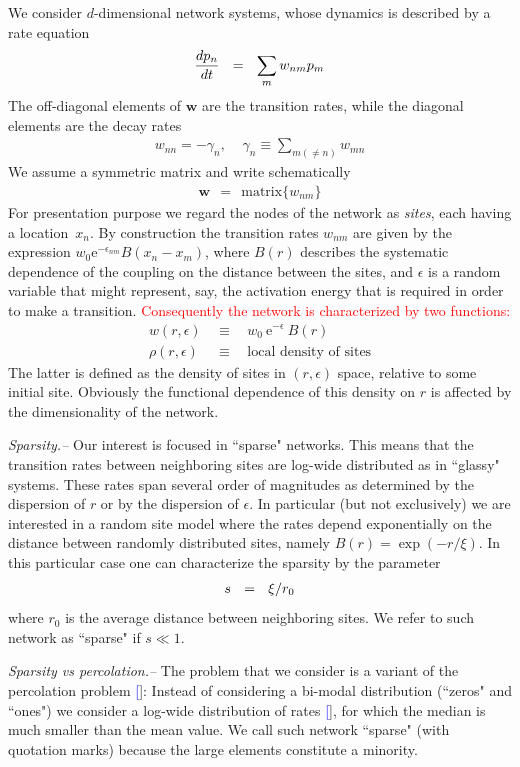 \documentclass[aps,prb,floats,floatfix,twocolumn]{revtex4}
\newcommand{\eexp}{\mbox{e}^}
\newcommand{\mylabel}[1]{\label{#1}}
\newcommand{\beq}{\begin{eqnarray}}
\newcommand{\eeq}{\end{eqnarray}}
\newcommand{\be}[1]{\begin{eqnarray}\ifthenelse{#1=-1}
{\nonumber}{\ifthenelse{#1=0}{}{\mylabel{e#1}}}}
\newcommand{\rmrk}[1]{\textcolor{red}{#1}}
\renewcommand{\cite}[1]{\textcolor{blue}{[\onlinecite{#1}}]} %
\begin{document}
We consider $d$-dimensional network systems, 
whose dynamics is described by a rate equation
%
\be{1}
\frac{dp_n}{dt} \ \ =  \ \ \sum_m w_{nm} p_m 
\eeq
%
The off-diagonal elements of $\bm{w}$ 
are the transition rates, while the diagonal 
elements are the decay rates 
%
\beq
w_{nn} =-\gamma_n, 
\ \ \ \ \  \gamma_n\equiv \sum_{m (\neq n)} w_{mn}  
\eeq
%
We assume a symmetric matrix and write schematically
%
\beq
\bm{w} \ \ = \ \ \text{matrix}\{w_{nm}\}
\eeq
%
For presentation purpose we regard the nodes 
of the network as {\em sites}, 
each having a location~$x_n$. 
By construction the transition rates $w_{nm}$ 
are given by the expression ${w_0 \eexp{-\epsilon_{nm}} B(x_n{-}x_m)}$,  
where $B(r)$ describes the systematic dependence 
of the coupling on the distance between the sites, 
and $\epsilon$ is a random variable that might  
represent, say, the activation energy that is required 
in order to make a transition. \rmrk{Consequently the 
network is characterized by two functions:}
%
\beq
w(r,\epsilon) \ \ &\equiv& \ \ w_0 \ \eexp{-\epsilon} \ B(r) \\
\rho(r,\epsilon) \ \ &\equiv& \ \ \mbox{local density of sites}
\eeq
%
The latter is defined as the density 
of sites in $(r,\epsilon)$ space, 
relative to some initial site. 
Obviously the functional dependence 
of this density on $r$ is affected 
by the dimensionality of the network. 


{\em Sparsity.-- }
Our interest is focused in ``sparse" networks.
This means that the transition rates between 
neighboring sites are log-wide distributed    
as in ``glassy" systems. These rates span 
several order of magnitudes as determined 
by the dispersion of $r$ 
or by the dispersion of $\epsilon$. 
%
In particular (but not exclusively) we are interested 
in a random site model where the rates depend exponentially 
on the distance between randomly distributed sites, 
namely ${B(r) = \exp(-r/\xi)}$. 
In this particular case one can characterize the 
sparsity by the parameter 
%
\be{101}
s \ \ = \ \ {\xi} / {r_0}
\eeq
%
where $r_0$ is the average distance between 
neighboring sites. We refer to such network 
as ``sparse" if $s\ll1$.


{\em Sparsity vs percolation.-- }
The problem that we consider is a variant of the percolation problem \cite{aa0}:
Instead of considering a bi-modal distribution (``zeros" and ``ones")
we consider a log-wide distribution of rates \cite{Halp}, 
for which the median is much smaller than the mean value. 
We call such network ``sparse" (with quotation marks) because 
the large elements constitute a minority.
\end{document}

